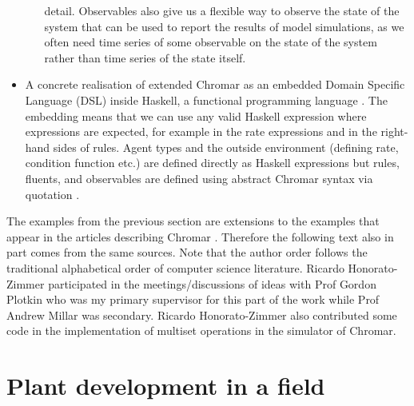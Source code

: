 \begin{itemize}
\begin{itemize}
    detail. Observables also give us a flexible way to observe the state of the
    system that can be used to report the results of model simulations, as we
    often need time series of some observable on the state of the system rather
    than time series of the state itself.
\end{itemize}
\item A concrete realisation of extended Chromar as an embedded Domain Specific
  Language (DSL) inside Haskell, a functional programming language
  \citep{gibbons_functional_2015}. The embedding means that we can use any valid
  Haskell expression where expressions are expected, for example in the rate
  expressions and in the right-hand sides of rules. Agent types and the outside
  environment (defining rate, condition function etc.) are defined directly as
  Haskell expressions but rules, fluents, and observables are defined using
  abstract Chromar syntax via quotation \citep{mainland_why_2007}.
\end{itemize}

The examples from the previous section are extensions to the examples that
appear in the articles describing Chromar \citep{honorato-zimmer_chromar_2017,
  honorato-zimmer_chromar_2018}. Therefore the following text also in part comes
from the same sources. Note that the author order follows the traditional
alphabetical order of computer science literature. Ricardo Honorato-Zimmer
participated in the meetings/discussions of ideas with Prof Gordon Plotkin who
was my primary supervisor for this part of the work while Prof Andrew Millar was
secondary. Ricardo Honorato-Zimmer also contributed some code in the
implementation of multiset operations in the simulator of Chromar.


\section{Plant development in a field}
\label{sec:plantDev}

